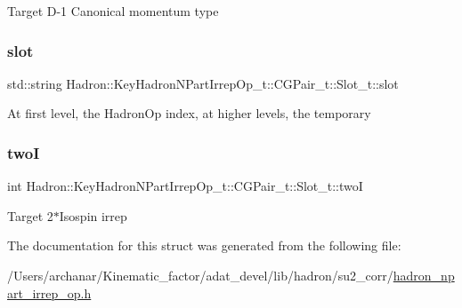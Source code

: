 Target D-\/1 Canonical momentum type \mbox{\label{structHadron_1_1KeyHadronNPartIrrepOp__t_1_1CGPair__t_1_1Slot__t_a48786cd4ae0529fc0b55e99893257007}} 
\subsubsection{\texorpdfstring{slot}{slot}}
{\footnotesize\ttfamily std\+::string Hadron\+::\+Key\+Hadron\+N\+Part\+Irrep\+Op\+\_\+t\+::\+C\+G\+Pair\+\_\+t\+::\+Slot\+\_\+t\+::slot}

At first level, the Hadron\+Op index, at higher levels, the temporary \mbox{\label{structHadron_1_1KeyHadronNPartIrrepOp__t_1_1CGPair__t_1_1Slot__t_a8586d34f626ec15fbebf2b18c82a9184}} 
\subsubsection{\texorpdfstring{twoI}{twoI}}
{\footnotesize\ttfamily int Hadron\+::\+Key\+Hadron\+N\+Part\+Irrep\+Op\+\_\+t\+::\+C\+G\+Pair\+\_\+t\+::\+Slot\+\_\+t\+::twoI}

Target 2$\ast$\+Isospin irrep 

The documentation for this struct was generated from the following file\+:\begin{DoxyCompactItemize}
\item 
/\+Users/archanar/\+Kinematic\+\_\+factor/adat\+\_\+devel/lib/hadron/su2\+\_\+corr/\mbox{\hyperlink{lib_2hadron_2su2__corr_2hadron__npart__irrep__op_8h}{hadron\+\_\+npart\+\_\+irrep\+\_\+op.\+h}}\end{DoxyCompactItemize}
